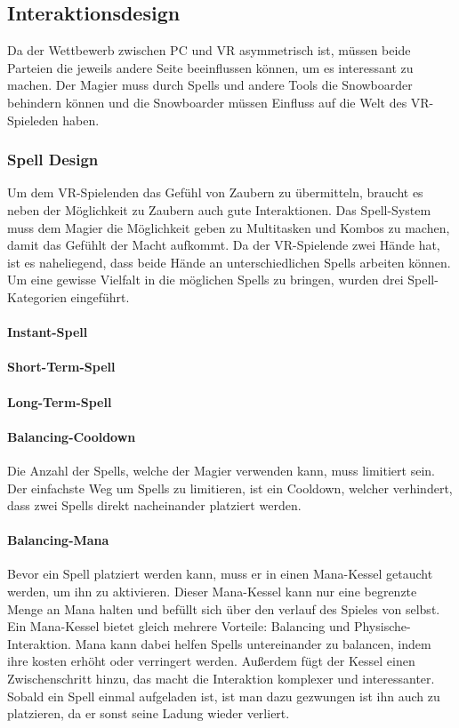 \subsection{Interaktionsdesign}

Da der Wettbewerb zwischen PC und VR asymmetrisch ist, müssen beide Parteien die jeweils andere Seite beeinflussen können, um es interessant zu machen. Der Magier muss durch Spells und andere Tools die Snowboarder behindern können und die Snowboarder müssen Einfluss auf die Welt des VR-Spieleden haben.

\subsubsection{Spell Design\label{_spell_design}}

Um dem VR-Spielenden das Gefühl von Zaubern zu übermitteln, braucht es neben der Möglichkeit zu Zaubern auch gute Interaktionen. Das Spell-System muss dem Magier die Möglichkeit geben zu Multitasken und Kombos zu machen, damit das Gefühlt der Macht aufkommt. Da der VR-Spielende zwei Hände hat, ist es naheliegend, dass beide Hände an unterschiedlichen Spells arbeiten können. Um eine gewisse Vielfalt in die möglichen Spells zu bringen, wurden drei Spell-Kategorien eingeführt.

\paragraph{Instant-Spell}
\paragraph{Short-Term-Spell}
\paragraph{Long-Term-Spell}

\paragraph{Balancing-Cooldown}
Die Anzahl der Spells, welche der Magier verwenden kann, muss limitiert sein. Der einfachste Weg um Spells zu limitieren, ist ein Cooldown, welcher verhindert, dass  zwei Spells direkt nacheinander platziert werden.

\paragraph{Balancing-Mana}
Bevor ein Spell platziert werden kann, muss er in einen Mana-Kessel getaucht werden, um ihn zu aktivieren. Dieser Mana-Kessel kann nur eine begrenzte Menge an Mana halten und befüllt sich über den verlauf des Spieles von selbst. Ein Mana-Kessel bietet gleich mehrere Vorteile: Balancing und Physische-Interaktion. Mana kann dabei helfen Spells untereinander zu balancen, indem ihre kosten erhöht oder verringert werden. Außerdem fügt der Kessel einen Zwischenschritt hinzu, das macht die Interaktion komplexer und interessanter. Sobald ein Spell einmal aufgeladen ist, ist man dazu gezwungen ist ihn auch zu platzieren, da er sonst seine Ladung wieder verliert.

